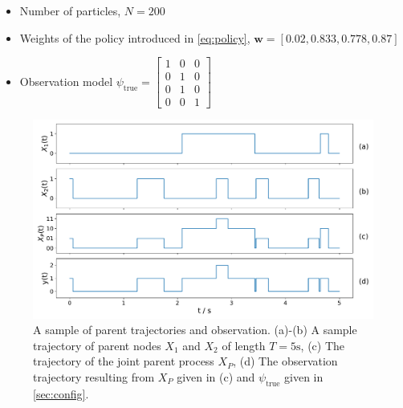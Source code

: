 \begin{itemize}
	\item Number of particles, $ N = 200 $
	\item Weights of the policy introduced in \autoref{eq:policy}, $ \textbf{w} = [0.02, 0.833, 0.778, 0.87] $
	\item Observation model
	$\psi_{\text{true}} =
	\begin{bmatrix}
		1 & 0 & 0 \\
		0 & 1 & 0 \\
		0 & 1 & 0 \\
		0 & 0 & 1
	\end{bmatrix}$
\end{itemize}
\begin{figure}[t]
	\begin{center}
		\includegraphics[width=.90\textwidth]{figures/sim_example/parent_traj}
		\caption[Parent trajectories and observation]{A sample of parent trajectories and observation. (a)-(b) A sample trajectory of parent nodes $ X_1 $ and $ X_2 $ of length $ T=5\text{s} $, (c) The trajectory of the joint parent process $ X_P $, (d) The observation trajectory resulting from $ X_P $ given in (c) and $ \psi_{\text{true}} $ given in \cref{sec:config}.}
		\label{fig:parent_traj}
	\end{center}
\end{figure}
